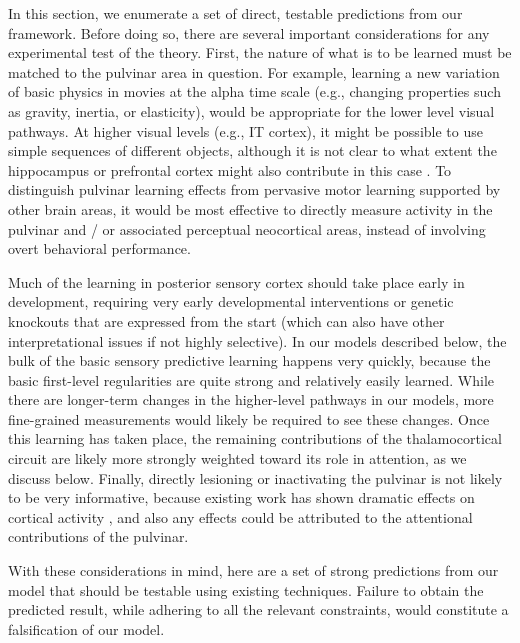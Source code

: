 \documentclass[11pt,twoside]{article}
\newif\myifpdf
\begin{document}
In this section, we enumerate a set of direct, testable predictions from our framework.  Before doing so, there are several important considerations for any experimental test of the theory.  First, the nature of what is to be learned must be matched to the pulvinar area in question.  For example, learning a new variation of basic physics in movies at the alpha time scale (e.g., changing properties such as gravity, inertia, or elasticity), would be appropriate for the lower level visual pathways.  At higher visual levels (e.g., IT cortex), it might be possible to use simple sequences of different objects, although it is not clear to what extent the hippocampus or prefrontal cortex might also contribute in this case \citep{GavornikBear14,FiserMahringerOyiboEtAl16}.  To distinguish pulvinar learning effects from pervasive motor learning supported by other brain areas, it would be most effective to directly measure activity in the pulvinar and / or associated perceptual neocortical areas, instead of involving overt behavioral performance. 

Much of the learning in posterior sensory cortex should take place early in development, requiring very early developmental interventions or genetic knockouts that are expressed from the start (which can also have other interpretational issues if not highly selective).  In our models described below, the bulk of the basic sensory predictive learning happens very quickly, because the basic first-level regularities are quite strong and relatively easily learned.  While there are longer-term changes in the higher-level pathways in our models, more fine-grained measurements would likely be required to see these changes.  Once this learning has taken place, the remaining contributions of the thalamocortical circuit are likely more strongly weighted toward its role in attention, as we discuss below.  Finally, directly lesioning or inactivating the pulvinar is not likely to be very informative, because existing work has shown dramatic effects on cortical activity \citep{ZhouSchaferDesimone16,PurushothamanMarionLiEtAl12}, and also any effects could be attributed to the attentional contributions of the pulvinar.

With these considerations in mind, here are a set of strong predictions from our model that should be testable using existing techniques.  Failure to obtain the predicted result, while adhering to all the relevant constraints, would constitute a falsification of our model.
\end{document}
